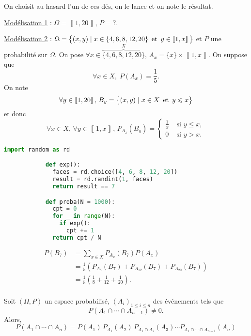 \begin{exm}
	On choisit au hasard l'un de ces dés, on le lance et on note le résultat. 

	\underline{Modélisation 1} : $\Omega = \left\llbracket 1,20 \right\rrbracket$, $P = ?$.

	\underline{Modélisation 2} : $\Omega = \big\{ (x,y) \mid x \in \{4, 6, 8, 12, 20\} \operatorname{\text{ et }} y \in \left\llbracket 1,x \right\rrbracket \big\}$ et $P$ une probabilité sur $\Omega$.
	On pose $\forall x \in \overbrace{\{4, 6, 8, 12, 20\}}^X,\, A_x = \{x\} \times \left\llbracket 1,x \right\rrbracket$. On suppose que \[
		\forall x \in X,\; P(A_x) = \frac{1}{5}.
	\] On note \[
		\forall y \in \left\llbracket 1,20 \right\rrbracket,\, B_y = \big\{ (x,y) \mid x \in X \operatorname{\text{ et }} y \leqslant x \big\}
	\] et donc \[
		\forall x \in X,\,\forall y \in \left\llbracket 1,x \right\rrbracket,\, P_{A_x}(B_y) = \begin{cases}
			\frac{1}{x} &\text{ si } y \le x,\\
			0 &\text{ si } y > x.
		\end{cases}
	\]

	\begin{algorithm}
		\begin{lstlisting}[language=python]
			import random as rd

			def exp():
			  faces = rd.choice([4, 6, 8, 12, 20])
			  result = rd.randint(1, faces)
			  return result == 7

			def proba(N = 1000):
			  cpt = 0
			  for _ in range(N):
			    if exp():
			      cpt += 1
			  return cpt / N
		\end{lstlisting}
	\end{algorithm}
	

	\begin{align*}
		P(B_7) &= \sum_{x \in X} P_{A_x}(B_7) P(A_x)\\
		&= \frac{1}{5}\left( P_{A_8}(B_7) + P_{A_{12}}(B_7) + P_{A_{20}}(B_7) \right)  \\
		&= \frac{1}{5}\left( \frac{1}{8} + \frac{1}{12}+\frac{1}{20} \right). \\
	\end{align*}
\end{exm}

\begin{prop}
	Soit $(\Omega, P)$ un espace probabilisé, $(A_i)_{1 \le i \le n}$ des événements tels que \[
		P(A_1 \cap \cdots \cap A_{n-1}) \neq 0.
	\] Alors, \[
		P(A_1 \cap \cdots \cap A_n) = P(A_1)\,P_{A_1}(A_2)\,P_{A_1 \cap A_2}(A_3) \cdots P_{A_1 \cap \cdots \cap A_{n-1}}(A_n)
	\]
\end{prop}

